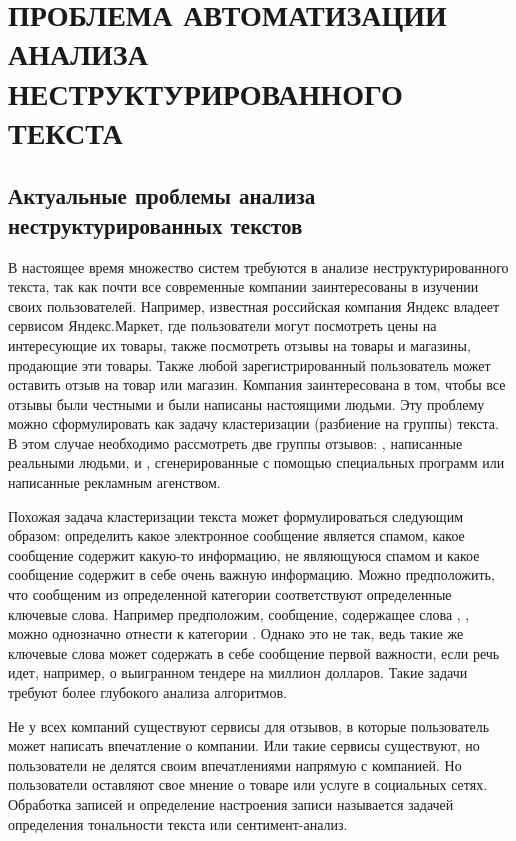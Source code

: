 
\chapter{ПРОБЛЕМА АВТОМАТИЗАЦИИ АНАЛИЗА НЕСТРУКТУРИРОВАННОГО ТЕКСТА}

\section{Актуальные проблемы анализа неструктурированных текстов}

В настоящее время множество систем требуются в анализе неструктурированного текста, так как почти все современные компании заинтересованы в изучении своих пользователей. Например, известная российская компания Яндекс владеет сервисом Яндекс.Маркет, где пользователи могут посмотреть цены на интересующие их товары, также посмотреть отзывы на товары и магазины, продающие эти товары. Также любой зарегистрированный пользователь может оставить отзыв на товар или магазин. Компания заинтересована в том, чтобы все отзывы были честными и были написаны настоящими людьми. Эту проблему можно сформулировать как задачу кластеризации (разбиение на группы) текста. В этом случае необходимо рассмотреть две группы отзывов: , написанные реальными людьми, и , сгенерированные с помощью специальных программ или написанные рекламным агенством.

Похожая задача кластеризации текста может формулироваться следующим образом: определить какое электронное сообщение является спамом, какое сообщение содержит какую-то информацию, не являющуюся спамом и какое сообщение содержит в себе очень важную информацию. Можно предположить, что сообщеним из определенной категории соответствуют определенные ключевые слова. Например предположим, сообщение, содержащее слова , ,  можно однозначно отнести к категории . Однако это не так, ведь такие же ключевые слова может содержать в себе сообщение первой важности, если речь идет, например, о выигранном тендере на миллион долларов. Такие задачи требуют более глубокого анализа алгоритмов.

Не у всех компаний существуют сервисы для отзывов, в которые пользователь может написать впечатление о компании. Или такие сервисы существуют, но пользователи не делятся своим впечатлениями напрямую с компанией. Но пользователи оставляют свое мнение о товаре или услуге в социальных сетях. Обработка записей и определение настроения записи называется задачей определения тональности текста или сентимент-анализ.

